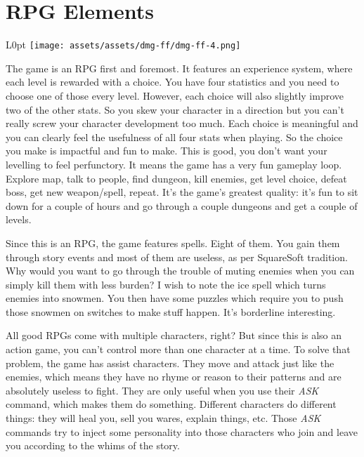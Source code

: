 \documentclass{book}
\begin{document}
\FloatBarrier\needspace{10mm}\section*{RPG Elements}\nopagebreak[4]

\begin{wrapfigure}{L}{0pt} \texttt{[image: assets/assets/dmg-ff/dmg-ff-4.png]}\end{wrapfigure}
The game is an RPG first and foremost. It features an experience system, where each level is rewarded with a choice. You have four statistics and you need to choose one of those every level. However, each choice will also slightly improve two of the other stats. So you skew your character in a direction but you can’t really screw your character development too much. Each choice is meaningful and you can clearly feel the usefulness of all four stats when playing. So the choice you make is impactful and fun to make. This is good, you don’t want your levelling to feel perfunctory. It means the game has a very fun gameplay loop. Explore map, talk to people, find dungeon, kill enemies, get level choice, defeat boss, get new weapon/spell, repeat. It’s the game’s greatest quality: it’s fun to sit down for a couple of hours and go through a couple dungeons and get a couple of levels.

Since this is an RPG, the game features spells. Eight of them. You gain them through story events and most of them are useless, as per SquareSoft tradition. Why would you want to go through the trouble of muting enemies when you can simply kill them with less burden? I wish to note the ice spell which turns enemies into snowmen. You then have some puzzles which require you to push those snowmen on switches to make stuff happen. It’s borderline interesting.

All good RPGs come with multiple characters, right? But since this is also an action game, you can’t control more than one character at a time. To solve that problem, the game has assist characters. They move and attack just like the enemies, which means they have no rhyme or reason to their patterns and are absolutely useless to fight. They are only useful when you use their \emph{ASK} command, which makes them do something. Different characters do different things: they will heal you, sell you wares, explain things, etc. Those \emph{ASK} commands try to inject some personality into those characters who join and leave you according to the whims of the story.
\end{document}
